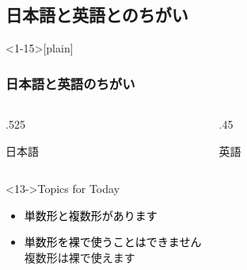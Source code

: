 \documentclass[aspectratio=169,xcolor={dvipsnames,table}]{beamer}
\begin{document}
\subsection{日本語と英語とのちがい}
\begin{frame}<1-15>[plain]\frametitle{日本語と英語のちがい}
  \begin{columns}
    \begin{column}[t]{.525\textwidth}
      \begin{alertblock}{日本語}



      \end{alertblock}
    \end{column}
    \begin{column}[t]{.45\textwidth}
      \begin{block}{英語}




      \end{block}
    \end{column}
  \end{columns}

  \begin{block}<13->{Topics for Today}\small
    \begin{itemize}[square]
      \item<14->  {\textcolor{black}{単数形と複数形があります}}
      \item<15->  {\textcolor{black}{単数形を裸で使うことはできません\,\,\dbend}}\\
            {複数形は裸で使えます}
    \end{itemize}
  \end{block}
\end{frame}
\end{document}
